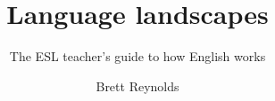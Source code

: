\author{Brett Reynolds} %
\title{Language landscapes}
\subtitle{The ESL teacher's guide to how English works}
\renewcommand{\lsSeries}{tbls} 
\renewcommand{\lsSeriesNumber}{16} 